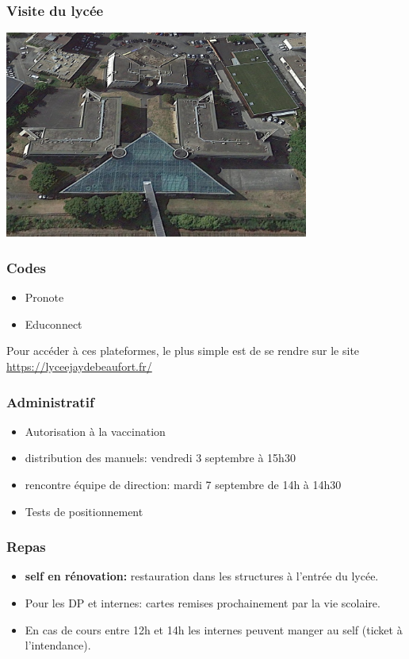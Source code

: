 \documentclass[svgnames,11pt]{beamer}
\begin{document}
\begin{frame}
    \frametitle{Visite du lycée}

    \begin{center}
        \centering
        \includegraphics[width=10cm]{jay.png}
    \end{center}

\end{frame}
\begin{frame}
    \frametitle{Codes}

    \begin{itemize}
        \item Pronote
        \item Educonnect
    \end{itemize}
    \begin{aretenir}[Remarque]
        Pour accéder à ces plateformes, le plus simple est de se rendre sur le site \url{https://lyceejaydebeaufort.fr/}
    \end{aretenir}
\end{frame}
\begin{frame}
    \frametitle{Administratif}

    \begin{itemize}
        \item Autorisation à la vaccination
        \item distribution des manuels: vendredi 3 septembre à 15h30
        \item rencontre équipe de direction: mardi 7 septembre de 14h à 14h30
        \item Tests de positionnement
    \end{itemize}

\end{frame}
\begin{frame}
    \frametitle{Repas}

    \begin{itemize}
        \item \textbf{self en rénovation:} restauration dans les structures à l'entrée du lycée.
        \item Pour les DP et internes: cartes remises prochainement par la vie scolaire.
        \item En cas de cours entre 12h et 14h les internes peuvent manger au self (ticket à l'intendance).
    \end{itemize}

\end{frame}
\end{document}
